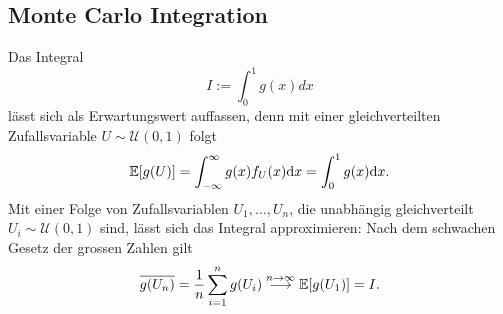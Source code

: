 \subsection{Monte Carlo Integration}

Das Integral
\[
	I := \int_0^1 g(x) dx
\]
lässt sich als Erwartungswert auffassen, denn mit einer gleichverteilten Zufallsvariable
\(U \sim \mathcal{U}(0,1)\) folgt
\[
	\mathbb{E}[g(U)] = \int_{-\infty}^\infty g(x) f_U(x) \mathrm{d} x = \int_0^1 g(x) \mathrm{d} x.
\]
Mit einer Folge von Zufallsvariablen \(U_1,\ldots,U_n\), die unabhängig gleichverteilt
\(U_i \sim \mathcal{U}(0,1)\) sind, lässt sich das Integral approximieren:
Nach dem schwachen Gesetz der grossen Zahlen gilt
\[
	\overline{g(U_n)} = \frac{1}{n}\sum_{i=1}^n g(U_i)
	\overset{n\rightarrow\infty}{\longrightarrow} \mathbb{E}[g(U_1)] = I.
\]


